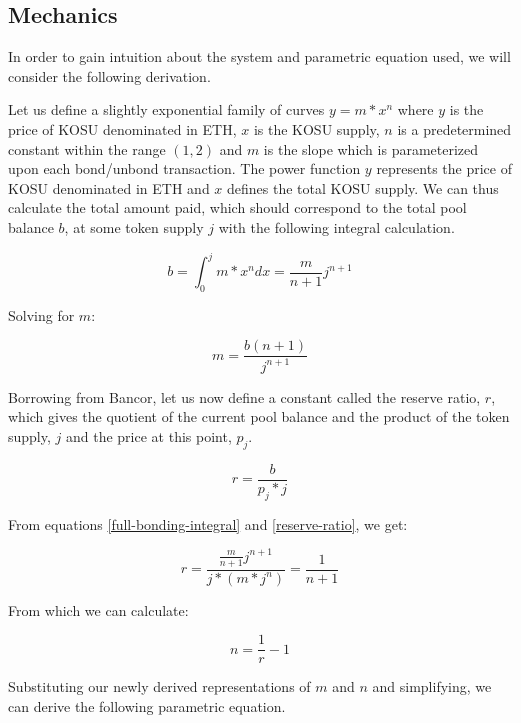 \documentclass[10pt]{article}
\begin{document}
\subsection{Mechanics}\label{token-distribution-mechanics}
In order to gain intuition about the system and parametric equation used, we will consider the following derivation.
\medskip

Let us define a slightly exponential family of curves $ y = m*x^n $ where $y$ is the price of KOSU denominated in ETH, $x$ is the KOSU supply, $n$ is a predetermined constant within the range $(1,2)$ and $m$ is the slope which is parameterized upon each bond/unbond transaction. The power function $y$ represents the price of KOSU denominated in ETH and $x$ defines the total KOSU supply. We can thus calculate the total amount paid, which should correspond to the total pool balance $b$, at some token supply $j$ with the following integral calculation.

\begin{equation}\label{full-bonding-integral}
  b = \int_{0}^{j} m*x^n dx = \frac{m}{n+1}j^{n+1}
\end{equation}
\medskip

\noindent Solving for $m$: 

\begin{equation}
  m = \frac{b(n+1)}{j^{n+1}}
\end{equation}
\medskip

Borrowing from Bancor, let us now define a constant called the reserve ratio, $r$, which gives the quotient of the current pool balance and the product of the token supply, $j$ and the price at this point, $p_j$\cite{bancor-whitepaper}.

\begin{equation}\label{reserve-ratio}
  r = \frac{b}{p_j*j}
\end{equation}
\medskip

\noindent From equations \ref{full-bonding-integral} and \ref{reserve-ratio}, we get:

\begin{equation}
  r = \frac{\frac{m}{n+1}j^{n+1}}{j*(m*j^n)} = \frac{1}{n+1}
\end{equation}
\medskip

\noindent From which we can calculate:

\begin{equation}
  n = \frac{1}{r}-1
\end{equation}
\medskip

\noindent Substituting our newly derived representations of $m$ and $n$ and simplifying, we can derive the following parametric equation.
\end{document}
